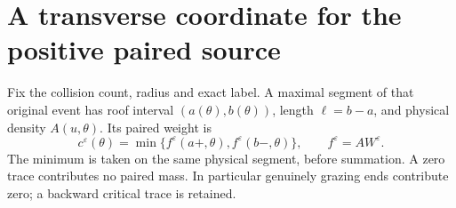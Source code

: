 \section{A transverse coordinate for the positive paired source}
\label{sec:v102-pair-coarea}
Fix the collision count, radius and exact label. A maximal segment of
that original event has roof interval $(a(\theta),b(\theta))$, length
$\ell=b-a$, and physical density $A(u,\theta)$. Its paired weight is
\[
 c^\varepsilon(\theta)=\min\{f^\varepsilon(a+,\theta),
                                      f^\varepsilon(b-,\theta)\},
 \qquad f^\varepsilon=AW^\varepsilon.
\]
The minimum is taken on the same physical segment, before summation.
A zero trace contributes no paired mass. In particular genuinely
grazing ends contribute zero; a backward critical trace is retained.

